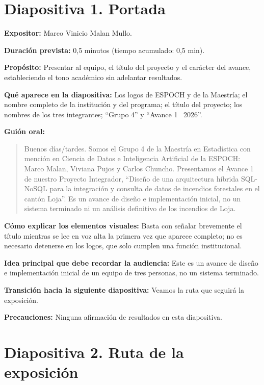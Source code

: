 \documentclass[11pt,a4paper]{article}
\newcommand{\campo}[2]{\par\medskip\noindent\textbf{#1:} #2\par}
\newenvironment{guionoral}{%
  \medskip\noindent\textbf{Gui\'on oral:}\par\smallskip
  \begin{quote}\small
}{%
  \end{quote}
}
\newcommand{\separadordiapositiva}{\bigskip\noindent{\color{Tierra!60}\hrulefill}\bigskip}
\begin{document}
\bigskip

\section*{Diapositiva 1. Portada}

\campo{Expositor}{Marco Vinicio Malan Mullo.}
\campo{Duraci\'on prevista}{0,5 minutos (tiempo acumulado: 0,5 min).}
\campo{Prop\'osito}{Presentar al equipo, el t\'itulo del proyecto y el
car\'acter del avance, estableciendo el tono acad\'emico sin adelantar
resultados.}
\campo{Qu\'e aparece en la diapositiva}{Los logos de ESPOCH y de la
Maestr\'ia; el nombre completo de la instituci\'on y del programa; el
t\'itulo del proyecto; los nombres de los tres integrantes; ``Grupo 4''
y ``Avance 1 \textbar\ 2026''.}

\begin{guionoral}
Buenos d\'ias/tardes. Somos el Grupo 4 de la Maestr\'ia en Estad\'istica
con menci\'on en Ciencia de Datos e Inteligencia Artificial de la
ESPOCH: Marco Malan, Viviana Pujos y Carlos Chuncho. Presentamos el
Avance 1 de nuestro Proyecto Integrador, ``Dise\~no de una arquitectura
h\'ibrida SQL-NoSQL para la integraci\'on y consulta de datos de
incendios forestales en el cant\'on Loja''. Es un avance de dise\~no e
implementaci\'on inicial, no un sistema terminado ni un an\'alisis
definitivo de los incendios de Loja.
\end{guionoral}

\campo{C\'omo explicar los elementos visuales}{Basta con se\~nalar
brevemente el t\'itulo mientras se lee en voz alta la primera vez que
aparece completo; no es necesario detenerse en los logos, que solo
cumplen una funci\'on institucional.}
\campo{Idea principal que debe recordar la audiencia}{Este es un
avance de dise\~no e implementaci\'on inicial de un equipo de tres
personas, no un sistema terminado.}
\campo{Transici\'on hacia la siguiente diapositiva}{Veamos la ruta que
seguir\'a la exposici\'on.}
\campo{Precauciones}{Ninguna afirmaci\'on de resultados en esta
diapositiva.}

\separadordiapositiva

\section*{Diapositiva 2. Ruta de la exposici\'on}
\end{document}
